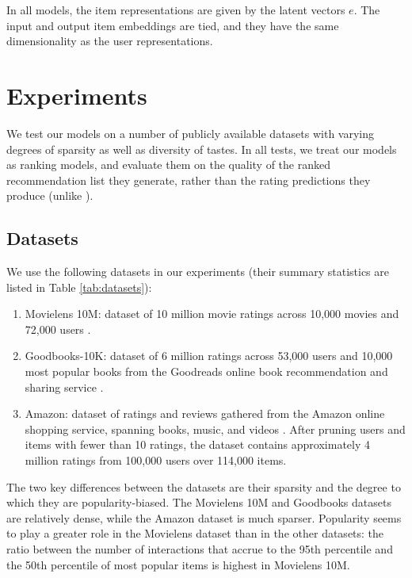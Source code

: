\documentclass[sigconf]{acmart}
\begin{document}
In all models, the item representations are given by the latent vectors $e$. The input and output item embeddings are tied, and they have the same dimensionality as the user representations.

\section{Experiments}
We test our models on a number of publicly available datasets with varying degrees of sparsity as well as diversity of tastes. In all tests, we treat our models as ranking models, and evaluate them on the quality of the ranked recommendation list they generate, rather than the rating predictions they produce (unlike \cite{wu2017recurrent}).


\subsection{Datasets}
We use the following datasets in our experiments (their summary statistics are listed in Table \ref{tab:datasets}):

\begin{enumerate}
\item Movielens 10M: dataset of 10 million movie ratings across 10,000 movies and 72,000 users \citep{harper2016movielens}.
\item Goodbooks-10K: dataset of 6 million ratings across 53,000 users and 10,000 most popular books from the Goodreads online book recommendation and sharing service \citep{goodbooks2017}.
\item Amazon: dataset of ratings and reviews gathered from the Amazon online shopping service, spanning books, music, and videos \citep{leskovec2007dynamics}. After pruning users and items with fewer than 10 ratings, the dataset contains approximately 4 million ratings from 100,000 users over 114,000 items.
\end{enumerate}
The two key differences between the datasets are their sparsity and the degree to which they are popularity-biased. The Movielens 10M and Goodbooks datasets are relatively dense, while the Amazon dataset is much sparser. Popularity seems to play a greater role in the Movielens dataset than in the other datasets: the ratio between the number of interactions that accrue to the 95th percentile and the 50th percentile of most popular items is highest in Movielens 10M.
\end{document}
